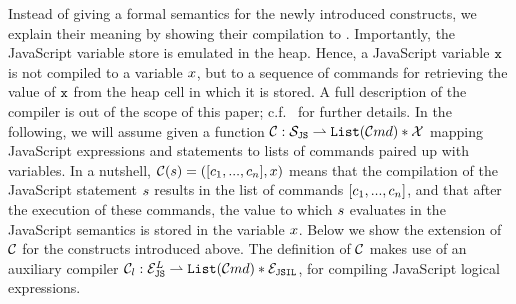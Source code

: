 Instead of giving a formal semantics for the newly introduced constructs, we explain 
their meaning by showing their compilation to \jsil. 
Importantly, the JavaScript variable store is emulated in the heap. 
Hence, a JavaScript variable $\mathtt{x}$ is not compiled to a \jsil variable $x$, but to a sequence  
of \jsil commands for retrieving the value of $\mathtt{x}$ from the heap cell in which it is stored. 
A full description of the compiler is out of the scope of this paper; c.f.~\cite{javert}
for further details. 
%
In the following, we will assume given a function ${\mathcal C} : \mathcal{S}_{\mathtt{JS}} \rightharpoonup \mathtt{List}(\mathcal{C}md) * \mathcal{X}$ mapping JavaScript expressions 
and statements to lists of \jsil commands paired up with \jsil variables. 
In a nutshell, ${\mathcal C}(s) = ([ c_1, ..., c_n], x)$ means that the compilation 
of the JavaScript statement $s$ results in the list of \jsil commands $[ c_1, ..., c_n]$, 
and that after the execution of these commands, the value to which $s$ evaluates in the 
JavaScript semantics is stored in the \jsil variable $x$. 
%
Below we show the extension of ${\mathcal C}$ for the constructs introduced above. 
The definition of ${\mathcal C}$ makes use of an auxiliary compiler ${\mathcal C}_l : \mathcal{E}_{\mathtt{JS}}^L \rightharpoonup \mathtt{List}(\mathcal{C}md) * \mathcal{E}_{\mathtt{JSIL}}$, 
for compiling JavaScript logical expressions.

